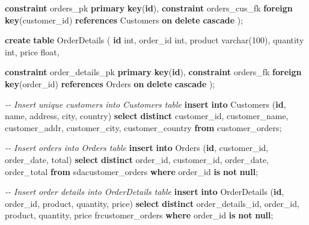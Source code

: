 \documentclass[12pt, french]{article}
\newenvironment{Shaded}{}{}
\newcommand{\KeywordTok}[1]{\textcolor[rgb]{0.00,0.44,0.13}{\textbf{{#1}}}}
\newcommand{\DataTypeTok}[1]{\textcolor[rgb]{0.56,0.13,0.00}{{#1}}}
\newcommand{\DecValTok}[1]{\textcolor[rgb]{0.25,0.63,0.44}{{#1}}}
\newcommand{\CommentTok}[1]{\textcolor[rgb]{0.38,0.63,0.69}{\textit{{#1}}}}
\newcommand{\NormalTok}[1]{{#1}}
\begin{document}
\begin{enumerate}
\begin{Shaded}
\begin{Highlighting}[]
    \KeywordTok{constraint}\NormalTok{ orders\_pk }\KeywordTok{primary} \KeywordTok{key}\NormalTok{(}\KeywordTok{id}\NormalTok{),}
    \KeywordTok{constraint}\NormalTok{ orders\_cus\_fk }\KeywordTok{foreign} \KeywordTok{key}\NormalTok{(customer\_id)}
        \KeywordTok{references}\NormalTok{ Customers }\KeywordTok{on} \KeywordTok{delete} \KeywordTok{cascade}
\NormalTok{);}

\KeywordTok{create} \KeywordTok{table}\NormalTok{ OrderDetails }
\NormalTok{(}
    \KeywordTok{id} \DataTypeTok{int}\NormalTok{,}
\NormalTok{    order\_id }\DataTypeTok{int}\NormalTok{,}
\NormalTok{    product }\DataTypeTok{varchar}\NormalTok{(}\DecValTok{100}\NormalTok{),}
\NormalTok{    quantity }\DataTypeTok{int}\NormalTok{,}
\NormalTok{    price }\DataTypeTok{float}\NormalTok{,}

    \KeywordTok{constraint}\NormalTok{ order\_details\_pk }\KeywordTok{primary} \KeywordTok{key}\NormalTok{(}\KeywordTok{id}\NormalTok{),}
    \KeywordTok{constraint}\NormalTok{ orders\_fk }\KeywordTok{foreign} \KeywordTok{key}\NormalTok{(order\_id)}
        \KeywordTok{references}\NormalTok{ Orders }\KeywordTok{on} \KeywordTok{delete} \KeywordTok{cascade}
\NormalTok{);}



\CommentTok{{-}{-} Insert unique customers into Customers table}
\KeywordTok{insert} \KeywordTok{into}\NormalTok{ Customers (}\KeywordTok{id}\NormalTok{, name, address, city, country)}
\KeywordTok{select} \KeywordTok{distinct}\NormalTok{ customer\_id, customer\_name, customer\_addr, customer\_city, customer\_country}
\KeywordTok{from}\NormalTok{ customer\_orders;}

\CommentTok{{-}{-} Insert orders into Orders table}
\KeywordTok{insert} \KeywordTok{into}\NormalTok{ Orders (}\KeywordTok{id}\NormalTok{, customer\_id, order\_date, total)}
\KeywordTok{select} \KeywordTok{distinct}\NormalTok{ order\_id, customer\_id, order\_date, order\_total}
\KeywordTok{from}\NormalTok{ sdacustomer\_orders}
\KeywordTok{where}\NormalTok{ order\_id }\KeywordTok{is} \KeywordTok{not} \KeywordTok{null}\NormalTok{;}

\CommentTok{{-}{-} Insert order details into OrderDetails table}
\KeywordTok{insert} \KeywordTok{into}\NormalTok{ OrderDetails (}\KeywordTok{id}\NormalTok{, order\_id, product, quantity, price)}
\KeywordTok{select} \KeywordTok{distinct}\NormalTok{ order\_details\_id, order\_id, product, quantity, price}
\NormalTok{frcustomer\_orders}
\KeywordTok{where}\NormalTok{ order\_id }\KeywordTok{is} \KeywordTok{not} \KeywordTok{null}\NormalTok{;}
\end{Highlighting}
\end{Shaded}
\end{enumerate}
\end{document}
